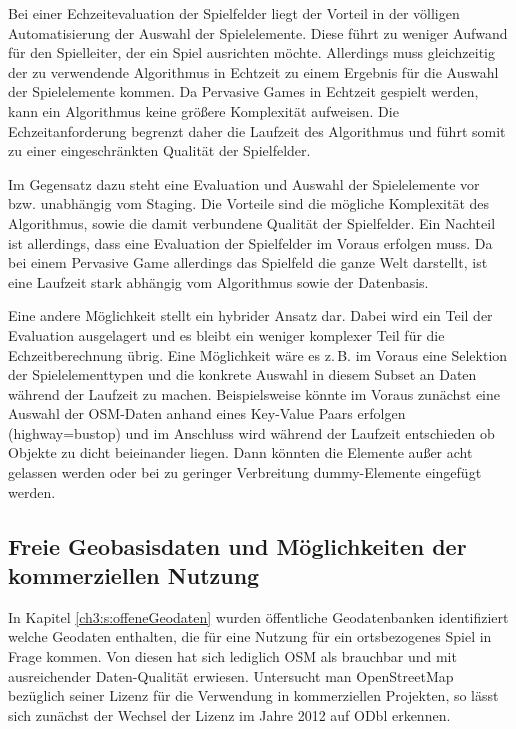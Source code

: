 Bei einer Echzeitevaluation der Spielfelder liegt der Vorteil in der völligen Automatisierung der Auswahl der Spielelemente. Diese führt zu weniger Aufwand für den Spielleiter, der ein Spiel ausrichten möchte. Allerdings muss gleichzeitig der zu verwendende Algorithmus in Echtzeit zu einem Ergebnis für die Auswahl der Spielelemente kommen. Da Pervasive Games in Echtzeit gespielt werden, kann ein Algorithmus keine größere Komplexität aufweisen. Die Echzeitanforderung begrenzt daher die Laufzeit des Algorithmus und führt somit zu einer eingeschränkten Qualität der Spielfelder.

Im Gegensatz dazu steht eine Evaluation und Auswahl der Spielelemente vor bzw. unabhängig vom Staging. Die Vorteile sind die mögliche Komplexität des Algorithmus, sowie die damit verbundene Qualität der Spielfelder. Ein Nachteil ist allerdings, dass eine Evaluation der Spielfelder im Voraus erfolgen muss. Da bei einem Pervasive Game allerdings das Spielfeld die ganze Welt darstellt, ist eine Laufzeit stark abhängig vom Algorithmus sowie der Datenbasis.

Eine andere Möglichkeit stellt ein hybrider Ansatz dar. Dabei wird ein Teil der Evaluation ausgelagert und es bleibt ein weniger komplexer Teil für die Echzeitberechnung übrig. Eine Möglichkeit wäre es z.\,B. im Voraus eine Selektion der Spielelementtypen und die konkrete Auswahl in diesem Subset an Daten während der Laufzeit zu machen. Beispielsweise könnte im Voraus zunächst eine Auswahl der OSM-Daten anhand eines Key-Value Paars erfolgen (highway=bustop) und im Anschluss wird während der Laufzeit entschieden ob Objekte zu dicht beieinander liegen. Dann könnten die Elemente außer acht gelassen werden oder bei zu geringer Verbreitung dummy-Elemente eingefügt werden.

\subsection*{Freie Geobasisdaten und Möglichkeiten der kommerziellen Nutzung}

In Kapitel \ref{ch3:s:offeneGeodaten} wurden öffentliche Geodatenbanken identifiziert welche Geodaten enthalten, die für eine Nutzung für ein ortsbezogenes Spiel in Frage kommen. Von diesen hat sich lediglich OSM als brauchbar und mit ausreichender Daten-Qualität erwiesen. Untersucht man OpenStreetMap bezüglich seiner Lizenz für die Verwendung in kommerziellen Projekten, so lässt sich zunächst der Wechsel der Lizenz im Jahre 2012 auf ODbl erkennen.\cite{Ramthun.2012}

